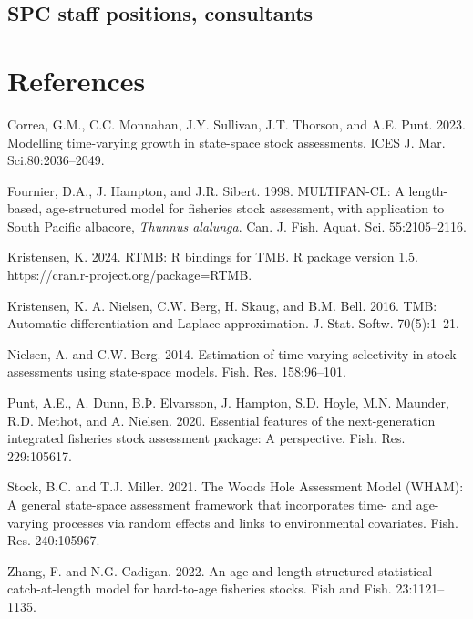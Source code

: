 \documentclass{SCreport}
\begin{document}
\subsection{SPC staff positions, consultants}

\section{References}

\sloppy\setlength{}

\begin{description}\setlength\itemsep{0ex}
  \item Correa, G.M., C.C. Monnahan, J.Y. Sullivan, J.T. Thorson, and A.E. Punt.
  2023. Modelling time-varying growth in state-space stock assessments. ICES J.
  Mar. Sci.80:2036--2049.
  \item Fournier, D.A., J. Hampton, and J.R. Sibert. 1998. MULTIFAN-CL: A
  length-based, age-structured model for fisheries stock assessment, with
  application to South Pacific albacore, \textit{Thunnus alalunga}. Can. J.
  Fish. Aquat. Sci. 55:2105--2116.
  \item Kristensen, K. 2024. RTMB: R bindings for TMB. R package version 1.5.\\
  https://cran.r-project.org/package=RTMB.
  \item Kristensen, K. A. Nielsen, C.W. Berg, H. Skaug, and B.M. Bell. 2016.
  TMB: Automatic differentiation and Laplace approximation. J. Stat. Softw.
  70(5):1--21.
  \item Nielsen, A. and C.W. Berg. 2014. Estimation of time-varying selectivity
  in stock assessments using state-space models. Fish. Res. 158:96--101.
  \item Punt, A.E., A. Dunn, B.Þ. Elvarsson, J. Hampton, S.D. Hoyle, M.N.
  Maunder, R.D. Methot, and A. Nielsen. 2020. Essential features of the
  next-generation integrated fisheries stock assessment package: A perspective.
  Fish. Res. 229:105617.
  \item Stock, B.C. and T.J. Miller. 2021. The Woods Hole Assessment Model
  (WHAM): A general state-space assessment framework that incorporates time- and
  age-varying processes via random effects and links to environmental
  covariates. Fish. Res. 240:105967.
  \item Zhang, F. and N.G. Cadigan. 2022. An age-and length-structured
  statistical catch-at-length model for hard-to-age fisheries stocks. Fish and
  Fish. 23:1121--1135.
\end{description}
\end{document}

